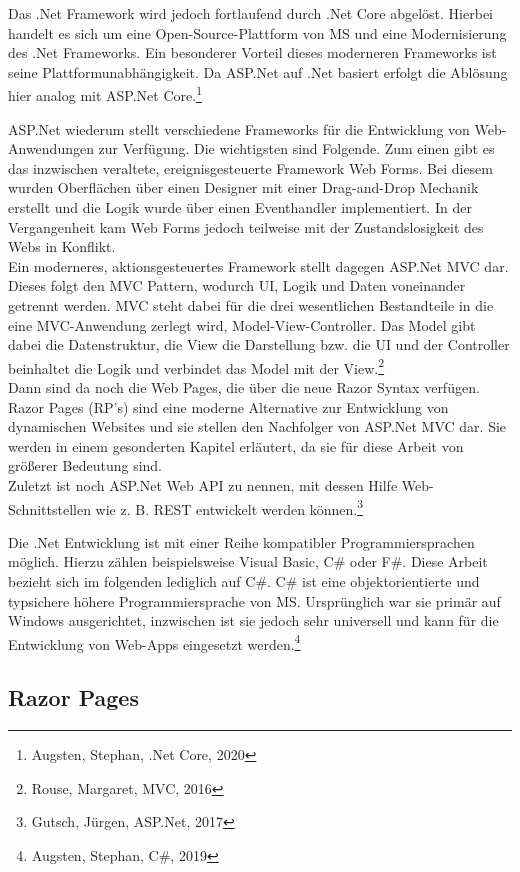 \documentclass[a4paper,
12pt,
oneside]
{article}
\newcommand{\sPar}{\par\vspace*{6pt}}
\begin{document}
	Das .Net Framework wird jedoch fortlaufend durch .Net Core abgelöst. Hierbei handelt es sich um eine Open-Source-Plattform von MS und eine Modernisierung des .Net Frameworks. Ein besonderer Vorteil dieses moderneren Frameworks ist seine Plattformunabhängigkeit. Da ASP.Net auf .Net basiert erfolgt die Ablösung hier analog mit ASP.Net Core.\footnote{Augsten, Stephan, .Net Core, 2020} \sPar
	ASP.Net wiederum stellt verschiedene Frameworks für die Entwicklung von Web-Anwendungen zur Verfügung. Die wichtigsten sind Folgende. Zum einen gibt es das inzwischen veraltete, ereignisgesteuerte Framework \glqq Web Forms\grqq. Bei diesem wurden Oberflächen über einen Designer mit einer Drag-and-Drop Mechanik erstellt und die Logik wurde über einen Eventhandler implementiert. In der Vergangenheit kam Web Forms jedoch teilweise mit der Zustandslosigkeit des Webs in Konflikt. \\
	Ein moderneres, aktionsgesteuertes Framework stellt dagegen ASP.Net MVC dar. Dieses folgt den MVC Pattern, wodurch UI, Logik und Daten voneinander getrennt werden. MVC steht dabei für die drei wesentlichen Bestandteile in die eine MVC-Anwendung zerlegt wird, \glqq Model-View-Controller\grqq. Das Model gibt dabei die Datenstruktur, die View die Darstellung bzw. die UI und der Controller beinhaltet die Logik und verbindet das Model mit der View.\footnote{Rouse, Margaret, MVC, 2016} \\
	Dann sind da noch die Web Pages, die über die neue Razor Syntax verfügen. Razor Pages (RP's) sind eine moderne Alternative zur Entwicklung von dynamischen Websites und sie stellen den Nachfolger von ASP.Net MVC dar. Sie werden in einem gesonderten Kapitel erläutert, da sie für diese Arbeit von größerer Bedeutung sind. \\
	Zuletzt ist noch ASP.Net Web API zu nennen, mit dessen Hilfe Web-Schnittstellen wie z. B. REST entwickelt werden können.\footnote{Gutsch, Jürgen, ASP.Net, 2017} \sPar
	Die .Net Entwicklung ist mit einer Reihe kompatibler Programmiersprachen möglich. Hierzu zählen beispielsweise Visual Basic, C\# oder F\#. Diese Arbeit bezieht sich im folgenden lediglich auf C\#. C\# ist eine objektorientierte und typsichere höhere Programmiersprache von MS. Ursprünglich war sie primär auf Windows ausgerichtet, inzwischen ist sie jedoch sehr universell und kann für die Entwicklung von Web-Apps eingesetzt werden.\footnote{Augsten, Stephan, C\#, 2019}
	
	
	
	\subsection{Razor Pages}
	
\end{document}
